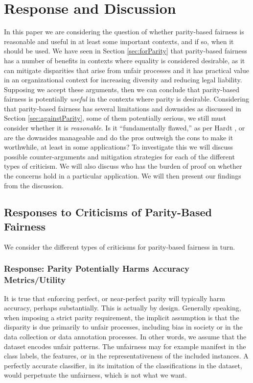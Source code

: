 \documentclass[11pt,dvipdfm]{article}
\begin{document}
\section{Response and Discussion}
In this paper we are considering the question of whether parity-based fairness is reasonable and useful in at least some important contexts, and if so, when it should be used.  We have seen in Section \ref{sec:forParity} that parity-based fairness has a number of benefits in contexts where equality is considered desirable, as it can mitigate disparities that arise from unfair processes and it has practical value in an organizational context for increasing diversity and reducing legal liability.  Supposing we accept these arguments, then we can conclude that parity-based fairness is potentially \emph{useful} in the contexts where parity is desirable.  Considering that parity-based fairness has several limitations and downsides as discussed in Section \ref{sec:againstParity}, some of them potentially serious, we still must consider whether it is \emph{reasonable}.  Is it ``fundamentally flawed,'' as per Hardt \cite{Hardt2016approaching}, or are the downsides manageable and do the pros outweigh the cons to make it worthwhile, at least in some applications?  To investigate this we will discuss possible counter-arguments and mitigation strategies for each of the different types of criticism.  We will also discuss who has the burden of proof on whether the concerns hold in a particular application.  We will then present our findings from the discussion. 

\subsection{Responses to Criticisms of Parity-Based Fairness}
We consider the different types of criticisms for parity-based fairness in turn.  

\subsubsection{Response: Parity Potentially Harms Accuracy Metrics/Utility}
It is true that enforcing perfect, or near-perfect parity will typically harm accuracy, perhaps substantially.  This is actually by design.  Generally speaking, when imposing a strict parity requirement, the implicit assumption is that the disparity is due primarily to unfair processes, including bias in society or in the data collection or data annotation processes.  In other words, we assume that the dataset encodes unfair patterns.  The unfairness may for example manifest in the class labels, the features, or in the representativeness of the included instances. 
A perfectly accurate classifier, in its imitation of the classifications in the dataset, would perpetuate the unfairness, which is not what we want.
\end{document}
